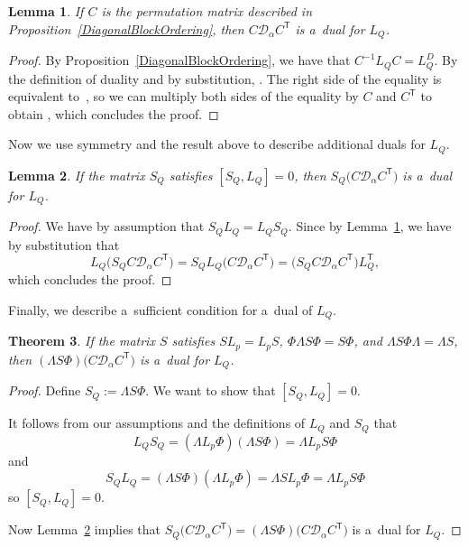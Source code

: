 \documentclass[pdftex]{sigma}
\numberwithin{equation}{section}
\newtheorem{Theorem}{Theorem}[section]
\newtheorem{Lemma}[Theorem]{Lemma}
\theoremstyle{definition}
\begin{document}
\begin{Lemma} \label{permutation-dual} If $C$ is the permutation matrix described in Proposition~{\rm\ref{DiagonalBlockOrdering}}, then $C \mathcal{D}_\alpha C^{\mathsf{T}}$ is a~dual for $L_Q$.
\end{Lemma}
\begin{proof}
 By Proposition~\ref{DiagonalBlockOrdering}, we have that $C^{-1} L_Q C = L_Q^D$. By the definition of duality and by substitution,
 .
 The right side of the equality is equivalent to~, so we can multiply both sides of the equality by $C$ and $C^{\mathsf{T}}$ to obtain , which concludes the proof.
\end{proof}

Now we use symmetry and the result above to describe additional duals for $L_Q$.

\begin{Lemma} \label{commutator} If the matrix $S_Q$ satisfies $[S_Q, L_Q] =0$, then $S_Q \bigl(C \mathcal{D}_\alpha C^{\mathsf{T}}\bigr)$ is a~dual for $L_Q$.
\end{Lemma}
\begin{proof} We have by assumption that $S_Q L_Q = L_Q S_Q$. Since  by Lemma~\ref{permutation-dual}, we have by substitution that
\[L_Q \bigl(S_Q C \mathcal{D}_\alpha C^{\mathsf{T}}\bigr) = S_Q L_Q \bigl(C \mathcal{D}_\alpha C^{\mathsf{T}}\bigr) =\bigl( S_Q C \mathcal{D}_\alpha C^{\mathsf{T}}\bigr) L_Q^{\mathsf{T}}, \] which concludes the proof.
\end{proof}

Finally, we describe a~sufficient condition for a~dual of $L_Q$.

\begin{Theorem} \label{s-lemma} If the matrix $S$ satisfies $S L_p = L_p S$, $\Phi \Lambda S \Phi = S \Phi$, and $\Lambda S \Phi \Lambda = \Lambda S$, then $(\Lambda S \Phi) \bigl( C \mathcal{D}_\alpha C^{\mathsf{T}}\bigr)$ is a~dual for $L_Q$.
\end{Theorem}
\begin{proof} Define $S_Q := \Lambda S \Phi$. We want to show that $[S_Q, L_Q]=0$.

It follows from our assumptions and the definitions of $L_Q$ and $S_Q$ that \[L_Q S_Q = (\Lambda L_p \Phi) (\Lambda S \Phi) = \Lambda L_p S \Phi\] and \[S_Q L_Q = (\Lambda S \Phi)(\Lambda L_p \Phi) = \Lambda S L_p \Phi = \Lambda L_p S \Phi\] so $[S_Q, L_Q] = 0$.

Now Lemma~\ref{commutator} implies that $S_Q \bigl( C \mathcal{D}_\alpha C^{\mathsf{T}}\bigr) = (\Lambda S \Phi)\bigl( C \mathcal{D}_\alpha C^{\mathsf{T}}\bigr)$ is a~dual for $L_Q$.
\end{proof}
\end{document}
